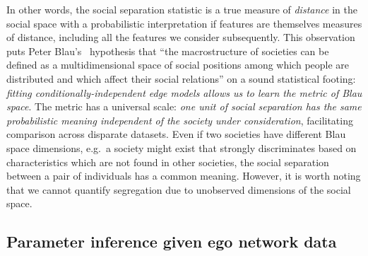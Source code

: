 \documentclass{scrartcl}
\begin{document}
In other words, the social separation statistic is a true measure of \emph{distance} in the social space with a probabilistic interpretation if features are themselves measures of distance, including all the features we consider subsequently. This observation puts Peter Blau's~\cite{Blau1977} hypothesis that ``the macrostructure of societies can be defined as a multidimensional space of social positions among which people are distributed and which affect their social relations'' on a sound statistical footing: \emph{fitting conditionally-independent edge models allows us to learn the metric of Blau space}. The metric has a universal scale: \emph{one unit of social separation has the same probabilistic meaning independent of the society under consideration}, facilitating comparison across disparate datasets. Even if two societies have different Blau space dimensions, e.g.\ a society might exist that strongly discriminates based on characteristics which are not found in other societies, the social separation between a pair of individuals has a common meaning. However, it is worth noting that we cannot quantify segregation due to unobserved dimensions of the social space.

\subsection{Parameter inference given ego network data\label{sec:inference}}
\end{document}

